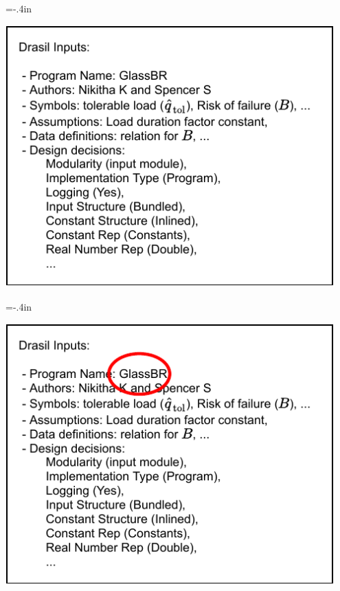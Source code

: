 \documentclass[usenames,dvipsnames]{beamer}
\begin{document}
\hoffset=-.4in %
\begin{frame}[plain]
  
  
  \includegraphics[width=0.95\textwidth]{DrasilInputs.pdf}
  
\end{frame}
\hoffset=0in %
\hoffset=-.4in %
\begin{frame}[plain]
  
  
  \includegraphics[width=0.95\textwidth]{InputsCircleGlassBR.pdf}
  
\end{frame}
\end{document}
